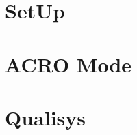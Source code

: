 \documentclass[3p,times,procedia]{elsarticle}
\begin{document}
	
		
	
	\newpage
	\section{SetUp}
		
	
	\newpage
	\section{ACRO Mode}
	
	
	\newpage
	\section{Qualisys}
	
	
%	
	
	\clearpage
		
\end{document}
